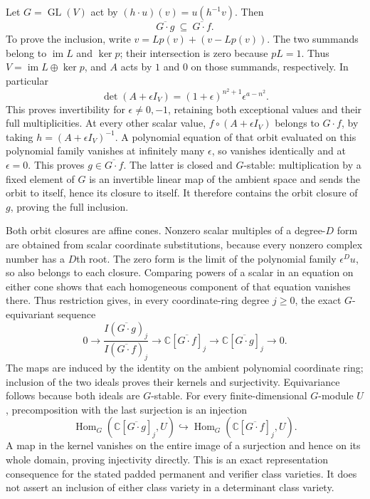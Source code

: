 Let $G=\operatorname{GL}(V)$ act by $(h\cdot u)(v)=u(h^{-1}v)$.
Then
\[
 \overline{G\cdot g}\ \subseteq\ \overline{G\cdot f}.
\]
To prove the inclusion, write
$v=Lp(v)+(v-Lp(v))$. The two summands belong to $\operatorname{im}L$
and $\ker p$; their intersection is zero because $pL=1$.
Thus $V=\operatorname{im}L\oplus\ker p$, and $A$ acts by $1$ and
$0$ on those summands, respectively. In particular
\[
 \det(A+\epsilon I_V)
   =(1+\epsilon)^{n^2+1}\epsilon^{a-n^2}.
\]
This proves invertibility for $\epsilon\ne0,-1$, retaining both
exceptional values and their full multiplicities.
At every other scalar value,
$f\circ(A+\epsilon I_V)$ belongs to $G\cdot f$, by taking
$h=(A+\epsilon I_V)^{-1}$. A polynomial equation of that orbit
evaluated on this polynomial family vanishes at infinitely many
$\epsilon$, so vanishes identically and at $\epsilon=0$.
This proves $g\in\overline{G\cdot f}$. The latter is closed and
$G$-stable: multiplication by a fixed element of $G$ is an
invertible linear map of the ambient space and sends the orbit to
itself, hence its closure to itself. It therefore contains the
orbit closure of $g$, proving the full inclusion.

Both orbit closures are affine cones. Nonzero scalar multiples of
a degree-$D$ form are obtained from scalar coordinate substitutions,
because every nonzero complex number has a $D$th root. The zero
form is the limit of the polynomial family $\epsilon^D u$, so also
belongs to each closure. Comparing powers of a scalar in an
equation on either cone shows that each homogeneous component of
that equation vanishes there. Thus restriction gives, in every
coordinate-ring degree $j\ge0$, the exact $G$-equivariant sequence
\[
 0\longrightarrow
 \frac{I(\overline{G\cdot g})_j}{I(\overline{G\cdot f})_j}
 \longrightarrow\mathbb C[\overline{G\cdot f}]_j
 \longrightarrow\mathbb C[\overline{G\cdot g}]_j
 \longrightarrow0.
\]
The maps are induced by the identity on the ambient polynomial
coordinate ring; inclusion of the two ideals proves their kernels
and surjectivity. Equivariance follows because both ideals are
$G$-stable. For every finite-dimensional $G$-module $U$,
precomposition with the last surjection is an injection
\[
 \operatorname{Hom}_G(\mathbb C[\overline{G\cdot g}]_j,U)
 \hookrightarrow
 \operatorname{Hom}_G(\mathbb C[\overline{G\cdot f}]_j,U).
\]
A map in the kernel vanishes on the entire image of a surjection
and hence on its whole domain, proving injectivity directly.
This is an exact representation consequence for the stated padded
permanent and verifier class varieties. It does not assert an
inclusion of either class variety in a determinant class variety.

